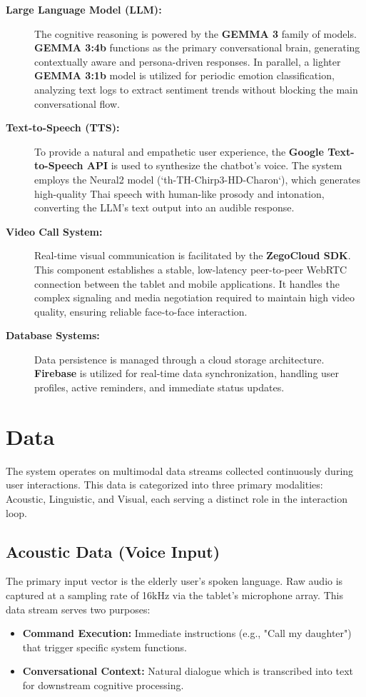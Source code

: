 \begin{description}
    \item[\textbf{Large Language Model (LLM):}] The cognitive reasoning is powered by the \textbf{GEMMA 3} family of models. \textbf{GEMMA 3:4b} functions as the primary conversational brain, generating contextually aware and persona-driven responses. In parallel, a lighter \textbf{GEMMA 3:1b} model is utilized for periodic emotion classification, analyzing text logs to extract sentiment trends without blocking the main conversational flow.
    
    \item[\textbf{Text-to-Speech (TTS):}] To provide a natural and empathetic user experience, the \textbf{Google Text-to-Speech API} is used to synthesize the chatbot's voice. The system employs the Neural2 model (`th-TH-Chirp3-HD-Charon`), which generates high-quality Thai speech with human-like prosody and intonation, converting the LLM's text output into an audible response.
    
    \item[\textbf{Video Call System:}] Real-time visual communication is facilitated by the \textbf{ZegoCloud SDK}. This component establishes a stable, low-latency peer-to-peer WebRTC connection between the tablet and mobile applications. It handles the complex signaling and media negotiation required to maintain high video quality, ensuring reliable face-to-face interaction.
    
    \item[\textbf{Database Systems:}] Data persistence is managed through a cloud storage architecture. \textbf{Firebase} is utilized for real-time data synchronization, handling user profiles, active reminders, and immediate status updates.
\end{description}
\section{Data}
{ 
	\setlength{\leftskip}{1cm}
	\setlength{\parindent}{2.5em}
	The system operates on multimodal data streams collected continuously during user interactions. This data is categorized into three primary modalities: Acoustic, Linguistic, and Visual, each serving a distinct role in the interaction loop.
	\par
}

\subsection{Acoustic Data (Voice Input)}
The primary input vector is the elderly user's spoken language. Raw audio is captured at a sampling rate of 16kHz via the tablet's microphone array. This data stream serves two purposes:
\begin{itemize}
    \item \textbf{Command Execution:} Immediate instructions (e.g., "Call my daughter") that trigger specific system functions.
    \item \textbf{Conversational Context:} Natural dialogue which is transcribed into text for downstream cognitive processing.
\end{itemize}

